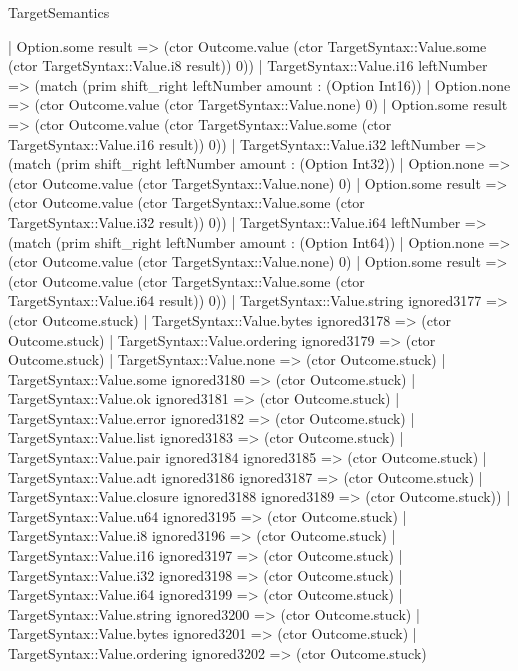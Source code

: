 \begin{lexlean}{TargetSemantics}
\begin{semanticmodule}
{                | Option.some result => (ctor Outcome.value (ctor TargetSyntax::Value.some (ctor TargetSyntax::Value.i8 result)) 0))
              | TargetSyntax::Value.i16 leftNumber => (match (prim shift_right leftNumber amount : (Option Int16))
                | Option.none => (ctor Outcome.value (ctor TargetSyntax::Value.none) 0)
                | Option.some result => (ctor Outcome.value (ctor TargetSyntax::Value.some (ctor TargetSyntax::Value.i16 result)) 0))
              | TargetSyntax::Value.i32 leftNumber => (match (prim shift_right leftNumber amount : (Option Int32))
                | Option.none => (ctor Outcome.value (ctor TargetSyntax::Value.none) 0)
                | Option.some result => (ctor Outcome.value (ctor TargetSyntax::Value.some (ctor TargetSyntax::Value.i32 result)) 0))
              | TargetSyntax::Value.i64 leftNumber => (match (prim shift_right leftNumber amount : (Option Int64))
                | Option.none => (ctor Outcome.value (ctor TargetSyntax::Value.none) 0)
                | Option.some result => (ctor Outcome.value (ctor TargetSyntax::Value.some (ctor TargetSyntax::Value.i64 result)) 0))
              | TargetSyntax::Value.string ignored3177 => (ctor Outcome.stuck)
              | TargetSyntax::Value.bytes ignored3178 => (ctor Outcome.stuck)
              | TargetSyntax::Value.ordering ignored3179 => (ctor Outcome.stuck)
              | TargetSyntax::Value.none => (ctor Outcome.stuck)
              | TargetSyntax::Value.some ignored3180 => (ctor Outcome.stuck)
              | TargetSyntax::Value.ok ignored3181 => (ctor Outcome.stuck)
              | TargetSyntax::Value.error ignored3182 => (ctor Outcome.stuck)
              | TargetSyntax::Value.list ignored3183 => (ctor Outcome.stuck)
              | TargetSyntax::Value.pair ignored3184 ignored3185 => (ctor Outcome.stuck)
              | TargetSyntax::Value.adt ignored3186 ignored3187 => (ctor Outcome.stuck)
              | TargetSyntax::Value.closure ignored3188 ignored3189 => (ctor Outcome.stuck))
            | TargetSyntax::Value.u64 ignored3195 => (ctor Outcome.stuck)
            | TargetSyntax::Value.i8 ignored3196 => (ctor Outcome.stuck)
            | TargetSyntax::Value.i16 ignored3197 => (ctor Outcome.stuck)
            | TargetSyntax::Value.i32 ignored3198 => (ctor Outcome.stuck)
            | TargetSyntax::Value.i64 ignored3199 => (ctor Outcome.stuck)
            | TargetSyntax::Value.string ignored3200 => (ctor Outcome.stuck)
            | TargetSyntax::Value.bytes ignored3201 => (ctor Outcome.stuck)
            | TargetSyntax::Value.ordering ignored3202 => (ctor Outcome.stuck)
}
\end{semanticmodule}
\end{lexlean}
